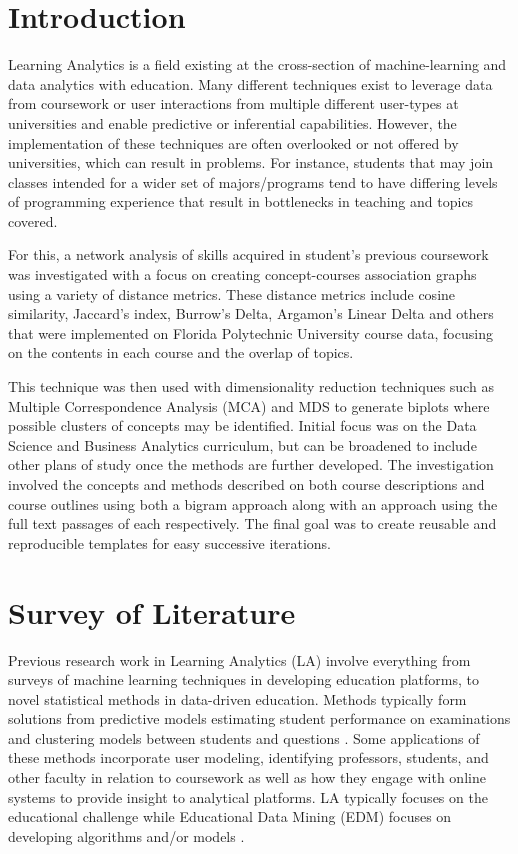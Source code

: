 \documentclass[11pt]{report}
\begin{document}
\section{Introduction}

\hspace*{0.5cm} Learning Analytics is a field existing at the cross-section of machine-learning and data analytics with education. Many different techniques exist to leverage data from coursework or user interactions from multiple different user-types at universities and enable predictive or inferential capabilities. However, the implementation of these techniques are often overlooked or not offered by universities, which can result in problems. For instance, students that may join classes intended for a wider set of majors/programs tend to have differing levels of programming experience that result in bottlenecks in teaching and topics covered. 

For this, a network analysis of skills acquired in student’s previous coursework was investigated with a focus on creating concept-courses association graphs using a variety of distance metrics.  These distance metrics include cosine similarity,  Jaccard's index, Burrow's Delta, Argamon's Linear Delta and others \citep{lan_tag-aware_2014}\citep{lan_sparse_nodate}  that were implemented on Florida Polytechnic University course data, focusing on the contents in each course and the overlap of topics. 

\indent This technique was then used with dimensionality reduction techniques such as Multiple Correspondence Analysis (MCA) and MDS to generate biplots where possible clusters of concepts may be identified.  Initial focus was on the Data Science and Business Analytics curriculum, but can be broadened to include other plans of study once the methods are further developed. The investigation involved the concepts and methods described on both course descriptions and course outlines using both a bigram approach along with an approach using the full text passages of each respectively.  The final goal was to create reusable and reproducible templates for easy successive iterations. 




\section{Survey of Literature}



\indent Previous research work in Learning Analytics (LA) involve everything from surveys of machine learning techniques in developing education platforms, to novel statistical methods in data-driven education. Methods typically form solutions from predictive models estimating student performance on examinations and clustering models between students and questions \cite{barbu_data_nodate}. Some applications of these methods incorporate user modeling, identifying professors, students, and other faculty in relation to coursework as well as how they engage with online systems to provide insight to analytical platforms. LA typically focuses on the educational challenge while Educational Data Mining (EDM) focuses on developing algorithms and/or models \citep{hilliger_evaluating_2019}.
\end{document}
